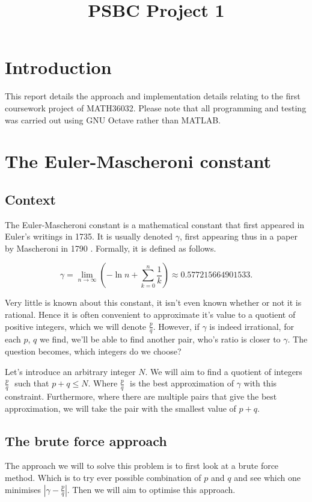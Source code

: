 \documentclass[10pt]{article}
\title{PSBC Project 1}
\newcommand*{\gam}{$\gamma$}
\newcommand*{\pdivq}{$\frac{p}{q} \text{ }$}
\newcommand{\inlinemaketitle}{{\let\newpage\relax\maketitle}}
\begin{document}
\inlinemaketitle
\section{Introduction}

This report details the approach and implementation details relating to the first coursework project of MATH36032. Please note that all programming and testing was carried out using GNU Octave rather than MATLAB.
\section{The Euler-Mascheroni constant}

\subsection{Context}
The Euler-Mascheroni constant is a mathematical constant that first appeared in Euler's writings in 1735. It is usually denoted \gam, first appearing thus in a paper by Mascheroni in 1790 \cite{eulerconst}. Formally, it is defined as follows.

\begin{equation}
\gamma = \lim_{n \to \infty}  \left( -\ln{n} + \sum_{k=0}^{n} \frac{1}{k}  \right) \approx 0.577215664901533.
\end{equation}

Very little is known about this constant, it isn't even known whether or not it is rational. Hence it is often convenient to approximate it's value to a quotient of positive integers, which we will denote $ \frac{p}{q}$. However, if $\gamma$ is indeed irrational, for each $p$, $q$ we find, we'll be able to find another pair, who's ratio is closer to \gam. The question becomes, which integers do we choose?

Let's introduce an arbitrary integer $N$. We will aim to find a quotient of integers \pdivq such that $p + q \leq N$. Where \pdivq is the best approximation of $\gamma$ with this constraint. Furthermore, where there are multiple pairs that give the best approximation, we will take the pair with the smallest value of $p+q$.

\subsection{The brute force approach}

The approach we will to solve this problem is to first look at a brute force method. Which is to try ever possible combination of $p$ and $q$ and see which one minimises $ | \gamma - \frac{p}{q} |$. Then we will aim to optimise this approach.
\end{document}
